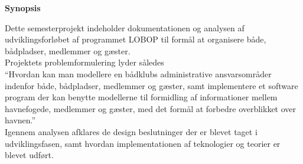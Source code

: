 \begin{center}\textbf{Synopsis}\\ \end{center}

Dette semesterprojekt indeholder dokumentationen og analysen af udviklingsforløbet af programmet LOBOP til formål at organisere både, bådpladser, medlemmer og gæster.\\

Projektets problemformulering lyder således\\

\enquote{Hvordan kan man modellere en bådklubs administrative ansvarsområder indenfor både, bådpladser, medlemmer og gæster, samt implementere et software program der kan benytte modellerne til formidling af informationer mellem havnefogede, medlemmer og gæster, med det formål at forbedre overblikket over havnen.}\\

Igennem analysen afklares de design beslutninger der er blevet taget i udviklingsfasen, samt hvordan implementationen af teknologier og teorier er blevet udført.
	

	




